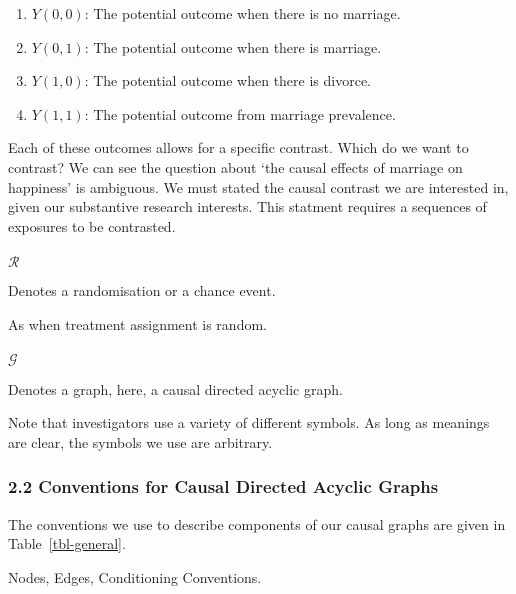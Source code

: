 \documentclass[
  single column]{article}
\makeatletter
\let\oldparagraph\paragraph
\renewcommand{\paragraph}{
    \@ifstar
      \xxxParagraphStar
      \xxxParagraphNoStar
  }
\newcommand{\xxxParagraphStar}[1]{\oldparagraph*{#1}\mbox{}}
\newcommand{\xxxParagraphNoStar}[1]{\oldparagraph{#1}\mbox{}}
\providecommand{\tightlist}{%
  \setlength{\itemsep}{0pt}\setlength{\parskip}{0pt}}\usepackage{longtable,booktabs,array}
\makeatother
\begin{document}
\begin{enumerate}
\def\labelenumi{\arabic{enumi}.}
\tightlist
\item
  \(Y(0, 0)\): The potential outcome when there is no marriage.
\item
  \(Y(0, 1)\): The potential outcome when there is marriage.
\item
  \(Y(1, 0)\): The potential outcome when there is divorce.
\item
  \(Y(1, 1)\): The potential outcome from marriage prevalence.
\end{enumerate}

Each of these outcomes allows for a specific contrast. Which do we want
to contrast? We can see the question about `the causal effects of
marriage on happiness' is ambiguous. We must stated the causal contrast
we are interested in, given our substantive research interests. This
statment requires a sequences of exposures to be contrasted.

\paragraph{\texorpdfstring{\(\mathcal{R}\)}{\textbackslash mathcal\{R\}}}\label{mathcalr}

Denotes a randomisation or a chance event.

As when treatment assignment is random.

\paragraph{\texorpdfstring{\(\mathcal{G}\)}{\textbackslash mathcal\{G\}}}\label{mathcalg}

Denotes a graph, here, a causal directed acyclic graph.

Note that investigators use a variety of different symbols. As long as
meanings are clear, the symbols we use are arbitrary.

\subsubsection{2.2 Conventions for Causal Directed Acyclic
Graphs}\label{conventions-for-causal-directed-acyclic-graphs}

The conventions we use to describe components of our causal graphs are
given in Table~\ref{tbl-general}.

\begin{table}

\caption{\label{tbl-general}Nodes, Edges, Conditioning Conventions.}

\centering{

\terminologygeneraldags

}

\end{table}%
\end{document}
